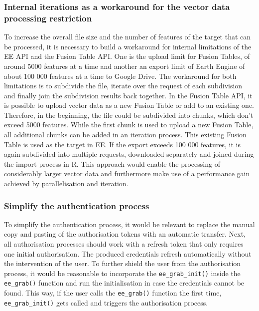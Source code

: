 \subsubsection{Internal iterations as a workaround for the vector data processing restriction}

To increase the overall file size and the number of features of the target that can be processed, it is necessary to build a workaround for internal limitations of the EE API and the Fusion Table API. One is the upload limit for Fusion Tables, of around 5000 features at a time and another an export limit of Earth Engine of about 100 000 features at a time to Google Drive. The workaround for both limitations is to subdivide the file, iterate over the request of each subdivision and finally join the subdivision results back together. In the Fusion Table API, it is possible to upload vector data as a new Fusion Table or add to an existing one. Therefore, in the beginning, the file could be subdivided into chunks, which don't exceed 5000 features. While the first chunk is used to upload a new Fusion Table, all additional chunks can be added in an iteration process. This existing Fusion Table is used as the target in EE. If the export exceeds 100 000 features, it is again subdivided into multiple requests, downloaded separately and joined during the import process in R. This approach would enable the processing of considerably larger vector data and furthermore make use of a performance gain achieved by parallelisation and iteration. 

\subsubsection{Simplify the authentication process}

To simplify the authentication process, it would be relevant to replace the manual copy and pasting of the authorisation tokens with an automatic transfer. Next, all authorisation processes should work with a refresh token that only requires one initial authorisation. The produced credentials refresh automatically without the intervention of the user. To further shield the user from the authorisation process, it would be reasonable to incorporate the \texttt{ee\_grab\_init()} inside the \texttt{ee\_grab()} function and run the initialisation in case the credentials cannot be found. This way, if the user calls the \texttt{ee\_grab()} function the first time, \texttt{ee\_grab\_init()} gets called and triggers the authorisation process. 

